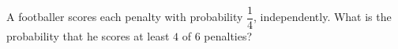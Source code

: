 A footballer scores each penalty with probability $\dfrac{1}{4}$, independently. What is the probability that he scores at least $4$ of $6$ penalties?
